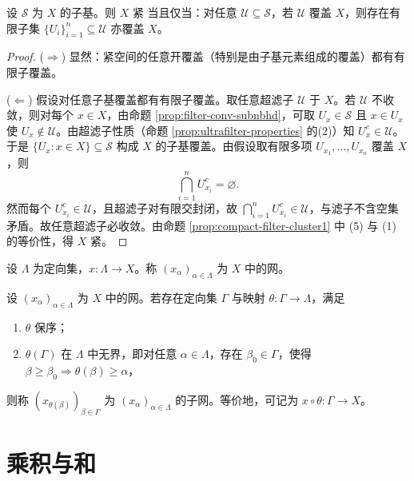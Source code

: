 \documentclass[lang=cn,a4paper,newtx,figureplace=section,tableplace=section]{elegantbook}
\begin{document}
  \begin{proposition}\label{prop:alexander-subbase}
  设 $\mathcal S$ 为 $X$ 的子基。则 $X$ 紧 当且仅当：对任意 $\mathcal U\subseteq\mathcal S$，若 $\mathcal U$ 覆盖 $X$，则存在有限子集 $\{U_i\}_{i=1}^n\subseteq\mathcal U$ 亦覆盖 $X$。
  \end{proposition}
  \begin{proof}
  ($\Rightarrow$) 显然：紧空间的任意开覆盖（特别是由子基元素组成的覆盖）都有有限子覆盖。
  
  ($\Leftarrow$) 假设对任意子基覆盖都有有限子覆盖。取任意超滤子 $\mathcal U$ 于 $X$。若 $\mathcal U$ 不收敛，则对每个 $x\in X$，由命题 \ref{prop:filter-conv-subnbhd}，可取 $U_x\in\mathcal S$ 且 $x\in U_x$ 使 $U_x\notin\mathcal U$。由超滤子性质（命题 \ref{prop:ultrafilter-properties} 的(2)）知 $U_x^c\in\mathcal U$。于是 $\{U_x:x\in X\}\subseteq\mathcal S$ 构成 $X$ 的子基覆盖。由假设取有限多项 $U_{x_1},\dots,U_{x_n}$ 覆盖 $X$，则
  \[
  \bigcap_{i=1}^n U_{x_i}^c=\varnothing.
  \]
  然而每个 $U_{x_i}^c\in\mathcal U$，且超滤子对有限交封闭，故 $\bigcap_{i=1}^n U_{x_i}^c\in\mathcal U$，与滤子不含空集矛盾。故任意超滤子必收敛。由命题 \ref{prop:compact-filter-cluster1} 中 (5) 与 (1) 的等价性，得 $X$ 紧。
  \end{proof}
  
 \begin{definition}[网]\label{def:net-variant}
  设 $\Lambda$ 为定向集，$x:\Lambda\to X$。称 $(x_\alpha)_{\alpha\in\Lambda}$ 为 $X$ 中的网。
  \end{definition}
  
  \begin{definition}[子网]\label{def:subnet}
  设 $(x_\alpha)_{\alpha\in\Lambda}$ 为 $X$ 中的网。若存在定向集 $\Gamma$ 与映射 $\theta: \Gamma\to\Lambda$，满足
  \begin{enumerate}
    \item $\theta$ 保序；
    \item $\theta(\Gamma)$ 在 $\Lambda$ 中无界，即对任意 $\alpha\in\Lambda$，存在 $\beta_0\in\Gamma$，使得 $\beta\ge\beta_0\Rightarrow\theta(\beta)\ge\alpha$，
  \end{enumerate}
  则称 $(x_{\theta(\beta)})_{\beta\in\Gamma}$ 为 $(x_\alpha)_{\alpha\in\Lambda}$ 的子网。等价地，可记为 $x\circ\theta: \Gamma\to X$。
  \end{definition}
  
 \chapter{乘积与和}
\end{document}
